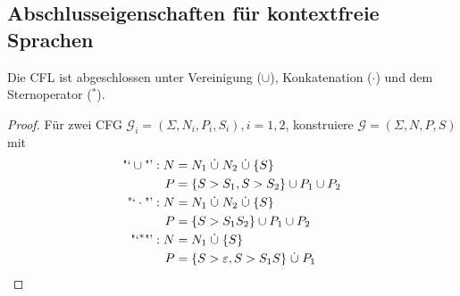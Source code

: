 % 
% 
% 
% 


\subsection{Abschlusseigenschaften für kontextfreie Sprachen}
\begin{Satz} %
  \label{thm:cfl-closed-reg-intersect}
	Die \ac{CFL} ist abgeschlossen unter Vereinigung ($\cup$), Konkatenation ($\cdot$) und dem Sternoperator ($^*$).
\end{Satz}
\begin{proof}
	Für zwei \ac{CFG} $\mathcal{G}_i = (\Sigma, N_i, P_i,S_i), i=1,2$, konstruiere $\mathcal{G} = (\Sigma, N,P,S)$ mit
	\begin{align*}
		\text{"`}\cup\text{"'}: N &= N_1\mathrel{\dot\cup} N_2\mathrel{\dot\cup}\{S\}\\
		P &= \{S\->S_1, S\->S_2 \} \cup P_1\cup P_2\\
		\text{"`}\cdot\text{"'}: N &= N_1\mathrel{\dot\cup} N_2\mathrel{\dot\cup}\{S\}\\
		P &= \{ S\->S_1S_2 \} \cup P_1\cup P_2\\
		\text{"`}^*\text{"'}: N &= N_1 \mathrel{\dot\cup} \{S\}\\
		P &= \{ S\->\varepsilon, S\-> S_1S \} \mathrel{\dot\cup} P_1
	\qedhere
	\end{align*}
\end{proof}

